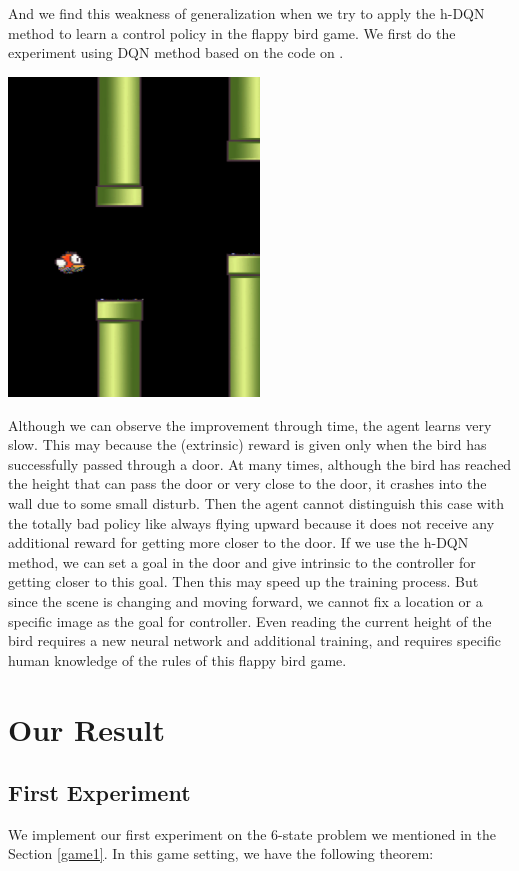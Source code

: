 \documentclass{article}
\begin{document}
\begin{spacing}{1.1}
    And we find this weakness of generalization when we try to apply the h-DQN method to learn a control policy in the flappy bird game. We first do the experiment using DQN method based on the code on \cite{github2}.
    \begin{center}
        \includegraphics[width = 0.5\textwidth]{Fluppy.png}
    \end{center}
    
    Although we can observe the improvement through time, the agent learns very slow. This may because the (extrinsic) reward is given only when the bird has successfully passed through a door. At many times, although the bird has reached the height that can pass the door or very close to the door, it crashes into the wall due to some small disturb. Then the agent cannot distinguish this case with the totally bad policy like always flying upward because it does not receive any additional reward for getting more closer to the door. If we use the h-DQN method, we can set a goal in the door and give intrinsic to the controller for getting closer to this goal. Then this may speed up the training process. But since the scene is changing and moving forward, we cannot fix a location or a specific image as the goal for controller. Even reading the current height of the bird requires a new neural network and additional training, and requires specific human knowledge of the rules of this flappy bird game.

    \section{Our Result}
    \subsection{First Experiment}
    We implement our first experiment on the 6-state problem we mentioned in the Section \ref{game1}. In this game setting, we have the following theorem:


\end{spacing}
\end{document}
